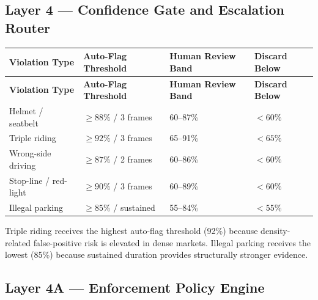 \documentclass[11pt,a4paper]{article}
\begin{document}
\subsection*{Layer 4 — Confidence Gate and Escalation Router}

\begin{longtable}{L{3.5cm} C{2.8cm} C{3cm} C{2.5cm}}
    \toprule
    \color{white}\textbf{Violation Type} & \color{white}\textbf{Auto-Flag Threshold} & \color{white}\textbf{Human Review Band} & \color{white}\textbf{Discard Below} \\
    \midrule
    \endfirsthead
    \toprule
    \color{white}\textbf{Violation Type} & \color{white}\textbf{Auto-Flag Threshold} & \color{white}\textbf{Human Review Band} & \color{white}\textbf{Discard Below} \\
    \midrule
    \endhead
    \bottomrule
    \endfoot

    Helmet / seatbelt & $\geq 88\%$ / 3 frames & 60--87\% & $< 60\%$ \\
    Triple riding & $\geq 92\%$ / 3 frames & 65--91\% & $< 65\%$ \\
    Wrong-side driving & $\geq 87\%$ / 2 frames & 60--86\% & $< 60\%$ \\
    Stop-line / red-light & $\geq 90\%$ / 3 frames & 60--89\% & $< 60\%$ \\
    Illegal parking & $\geq 85\%$ / sustained & 55--84\% & $< 55\%$ \\
\end{longtable}

Triple riding receives the highest auto-flag threshold (92\%) because density-related false-positive risk is elevated in dense markets. Illegal parking receives the lowest (85\%) because sustained duration provides structurally stronger evidence.

\subsection*{Layer 4A — Enforcement Policy Engine}
\end{document}
